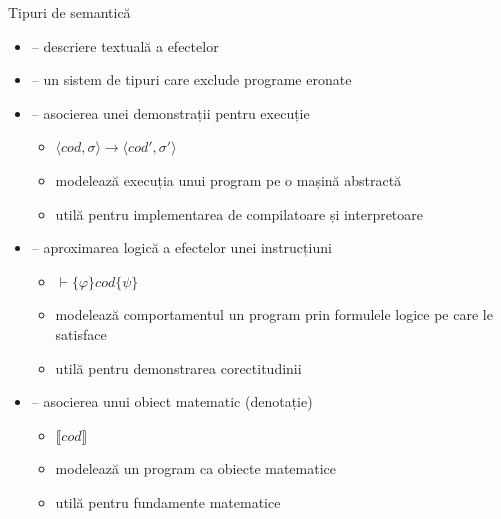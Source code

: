 \documentclass[xcolor=pdftex,romanian,colorlinks]{beamer}
\begin{document}
\begin{frame}{Tipuri de semantică}

\vspace{-.1cm}
\begin{itemize}
	\item {} -- descriere textuală a efectelor
	
	\smallskip  
	\item {} -- un sistem de tipuri care exclude programe eronate

	\smallskip  
	\item {} -- asocierea unei demonstrații pentru execuție
	\begin{itemize}
		\item $\langle cod, \sigma \rangle  \to  \langle cod', \sigma'\rangle$
		\item modelează execuția unui program pe o mașină abstractă
		\item utilă pentru implementarea de compilatoare și interpretoare
	\end{itemize}

	\smallskip  
	\item {} -- aproximarea logică a efectelor unei instrucțiuni 
	\begin{itemize}
		 \item $\vdash \{\varphi\} cod \{\psi\}$
		\item modelează comportamentul un program prin formulele logice pe care le satisface
		\item utilă pentru demonstrarea corectitudinii
	\end{itemize}
	
	\smallskip  
	\item {} -- asocierea unui obiect matematic (denotație)	
	\begin{itemize}
		\item $\llbracket cod \rrbracket$
		\item modelează un program ca obiecte matematice
		\item utilă pentru fundamente matematice
	\end{itemize}	
\end{itemize}
\end{frame}
\end{document}
